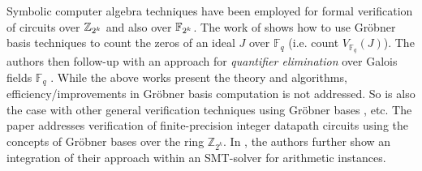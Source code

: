 Symbolic computer algebra techniques have been employed for formal
verification of circuits over ${\mathbb{Z}}_{2^k}$ and also over ${\mathbb{F}}_{2^k}$. 
The work of \cite{gao:gf-gb-ms} shows how to use Gr\"obner basis
techniques to count the zeros of an ideal $J$ over ${\mathbb{F}}_q$
(i.e. count $V_{{\mathbb{F}}_q}(J)$). The authors then follow-up with
an approach for {\it quantifier elimination} over Galois fields
${\mathbb{F}}_q$ \cite{gao:qe-gf-gb}. While the above works present
the theory and algorithms, efficiency/improvements in Gr\"obner basis
computation is not addressed. So is also the case with other general
verification techniques using Gr\"obner bases \cite{Avrunin:CAV}
\cite{gbverify:2007} \cite{manna:program}, etc. 
The paper \cite{wienand:cav08} addresses verification of
finite-precision integer datapath circuits using the concepts of
Gr\"obner bases over the ring ${\mathbb{Z}}_{2^k}$. 
In \cite{wedler:date11}, the authors further
show an integration of their approach within an SMT-solver for
arithmetic instances.  

